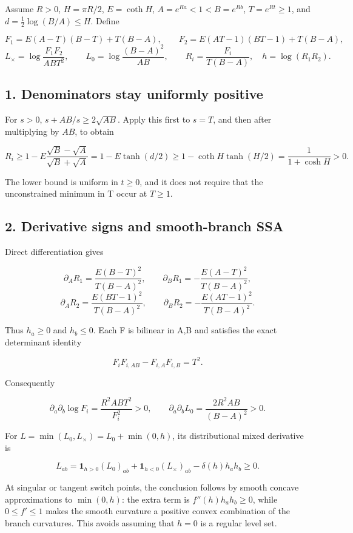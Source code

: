 \documentclass[11pt]{article}
\begin{document}
Assume \(R>0\), \(H=\pi R/2\), \(E=\coth H\), \(A=e^{Ra}<1<B=e^{Rb}\),
\(T=e^{Rt}\ge1\), and \(d=\tfrac12\log(B/A)\le H\). Define

\[
F_1=E(A-T)(B-T)+T(B-A),\qquad
F_2=E(AT-1)(BT-1)+T(B-A),
\] \[
L_\times=\log\frac{F_1F_2}{ABT^2},\qquad
L_0=\log\frac{(B-A)^2}{AB},\qquad
R_i=\frac{F_i}{T(B-A)},\quad h=\log(R_1R_2).
\]

\subsection{1. Denominators stay uniformly
positive}\label{denominators-stay-uniformly-positive}

For \(s>0\), \(s+AB/s\ge2\sqrt{AB}\). Apply this first to \(s=T\), and
then after multiplying by \(AB\), to obtain

\[
R_i\ge1-E\frac{\sqrt B-\sqrt A}{\sqrt B+\sqrt A}
=1-E\tanh(d/2)
\ge1-\coth H\tanh(H/2)
=\frac1{1+\cosh H}>0.
\]

The lower bound is uniform in \(t\ge0\), and it does not require that
the unconstrained minimum in T occur at \(T\ge1\).

\subsection{2. Derivative signs and smooth-branch
SSA}\label{derivative-signs-and-smooth-branch-ssa}

Direct differentiation gives

\[
\partial_A R_1=\frac{E(B-T)^2}{T(B-A)^2},\qquad
\partial_B R_1=-\frac{E(A-T)^2}{T(B-A)^2},
\] \[
\partial_A R_2=\frac{E(BT-1)^2}{T(B-A)^2},\qquad
\partial_B R_2=-\frac{E(AT-1)^2}{T(B-A)^2}.
\]

Thus \(h_a\ge0\) and \(h_b\le0\). Each F is bilinear in A,B and
satisfies the exact determinant identity

\[
F_iF_{i,AB}-F_{i,A}F_{i,B}=T^2.
\]

Consequently

\[
\partial_a\partial_b\log F_i
=\frac{R^2ABT^2}{F_i^2}>0,\qquad
\partial_a\partial_bL_0=\frac{2R^2AB}{(B-A)^2}>0.
\]

For \(L=\min(L_0,L_\times)=L_0+\min(0,h)\), its distributional mixed
derivative is

\[
L_{ab}=\mathbf1_{h>0}(L_0)_{ab}
+\mathbf1_{h<0}(L_\times)_{ab}
-\delta(h)h_a h_b\ge0.
\]

At singular or tangent switch points, the conclusion follows by smooth
concave approximations to \(\min(0,h)\): the extra term is
\(f''(h)h_a h_b\ge0\), while \(0\le f'\le1\) makes the smooth curvature
a positive convex combination of the branch curvatures. This avoids
assuming that \(h=0\) is a regular level set.
\end{document}
